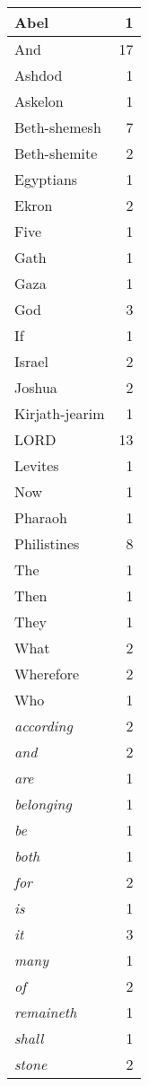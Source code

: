 \begin{center}
\begin{longtable}{l|r}
\hline \hline
\endlastfoot
Abel & 1 \\ \hline
And & 17 \\ \hline
Ashdod & 1 \\ \hline
Askelon & 1 \\ \hline
Beth-shemesh & 7 \\ \hline
Beth-shemite & 2 \\ \hline
Egyptians & 1 \\ \hline
Ekron & 2 \\ \hline
Five & 1 \\ \hline
Gath & 1 \\ \hline
Gaza & 1 \\ \hline
God & 3 \\ \hline
If & 1 \\ \hline
Israel & 2 \\ \hline
Joshua & 2 \\ \hline
Kirjath-jearim & 1 \\ \hline
LORD & 13 \\ \hline
Levites & 1 \\ \hline
Now & 1 \\ \hline
Pharaoh & 1 \\ \hline
Philistines & 8 \\ \hline
The & 1 \\ \hline
Then & 1 \\ \hline
They & 1 \\ \hline
What & 2 \\ \hline
Wherefore & 2 \\ \hline
Who & 1 \\ \hline
\emph{according} & 2 \\ \hline
\emph{and} & 2 \\ \hline
\emph{are} & 1 \\ \hline
\emph{belonging} & 1 \\ \hline
\emph{be} & 1 \\ \hline
\emph{both} & 1 \\ \hline
\emph{for} & 2 \\ \hline
\emph{is} & 1 \\ \hline
\emph{it} & 3 \\ \hline
\emph{many} & 1 \\ \hline
\emph{of} & 2 \\ \hline
\emph{remaineth} & 1 \\ \hline
\emph{shall} & 1 \\ \hline
\emph{stone} & 2 \\ \hline

\end{longtable}
\end{center}
